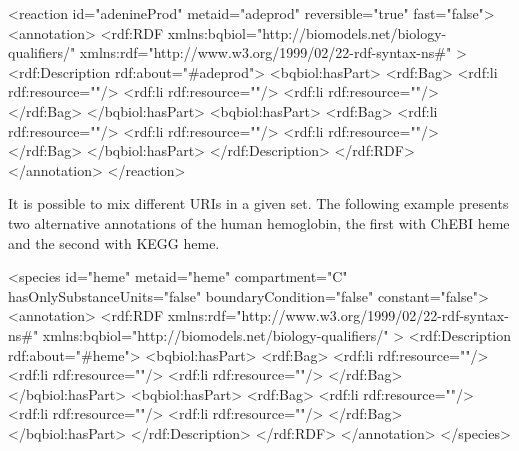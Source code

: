 \begin{example}
<reaction id="adenineProd" metaid="adeprod" reversible="true" fast="false">
  <annotation>
    <rdf:RDF
      xmlns:bqbiol="http://biomodels.net/biology-qualifiers/"
      xmlns:rdf="http://www.w3.org/1999/02/22-rdf-syntax-ns\#"
    >
      <rdf:Description rdf:about="\#adeprod">
        <bqbiol:hasPart>
          <rdf:Bag>
            <rdf:li rdf:resource="\!"/>
            <rdf:li rdf:resource="\!"/>
            <rdf:li rdf:resource="\!"/>
          </rdf:Bag>
        </bqbiol:hasPart>
        <bqbiol:hasPart>
          <rdf:Bag>
            <rdf:li rdf:resource="\!"/>
            <rdf:li rdf:resource="\!"/>
            <rdf:li rdf:resource="\!"/>
          </rdf:Bag>
        </bqbiol:hasPart>
      </rdf:Description>
    </rdf:RDF>
  </annotation>
</reaction>
\end{example}

It is possible to mix different URIs in a given set. The
following example presents two alternative annotations of the human
hemoglobin, the first with ChEBI heme and the second with KEGG
heme.

\begin{example}
<species id="heme" metaid="heme" compartment="C"
         hasOnlySubstanceUnits="false" boundaryCondition="false"
         constant="false">
  <annotation>
    <rdf:RDF
      xmlns:rdf="http://www.w3.org/1999/02/22-rdf-syntax-ns\#"
      xmlns:bqbiol="http://biomodels.net/biology-qualifiers/"
    >
     <rdf:Description rdf:about="\#heme">
       <bqbiol:hasPart>
         <rdf:Bag>
           <rdf:li rdf:resource="\!"/>
           <rdf:li rdf:resource="\!"/>
           <rdf:li rdf:resource="\!"/>
         </rdf:Bag>
       </bqbiol:hasPart>
       <bqbiol:hasPart>
         <rdf:Bag>
          <rdf:li rdf:resource="\!"/>
           <rdf:li rdf:resource="\!"/>
           <rdf:li rdf:resource="\!"/>
         </rdf:Bag>
       </bqbiol:hasPart>
     </rdf:Description>
   </rdf:RDF>
  </annotation>
</species>
\end{example}

